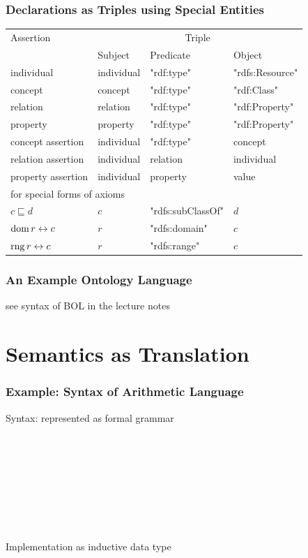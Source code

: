 \begin{frame}\frametitle{Declarations as Triples using Special Entities}
\begin{center}
\begin{tabular}{l|lll}
Assertion & \multicolumn{3}{c}{Triple} \\
          & Subject & Predicate & Object \\
\hline
individual & individual & "rdf:type" & "rdfs:Resource" \\
concept  & concept & "rdf:type" & "rdf:Class" \\
relation & relation & "rdf:type" & "rdf:Property" \\
property & property & "rdf:type" & "rdf:Property" \\
concept assertion  & individual & "rdf:type" & concept \\
relation assertion & individual & relation & individual \\
property assertion & individual & property & value \\
\hline
\multicolumn{4}{l}{for special forms of axioms}\\
$c\sqsubseteq d$ & $c$ & "rdfs:subClassOf" & $d$ \\
$\dom\,r\Equiv c$ & $r$ & "rdfs:domain" & $c$ \\
$\rng\, r\Equiv c$ & $r$ & "rdfs:range" & $c$ \\
\end{tabular}
\end{center}
\end{frame}

\begin{frame}\frametitle{An Example Ontology Language}
see syntax of BOL in the lecture notes
\end{frame}

\section{Semantics as Translation}

\begin{frame}\frametitle{Example: Syntax of Arithmetic Language}
Syntax: represented as formal grammar

\begin{commgrammar}
\\
\\
\\
\\
\\
\\
\\
\end{commgrammar}

Implementation as inductive data type
\end{frame}



